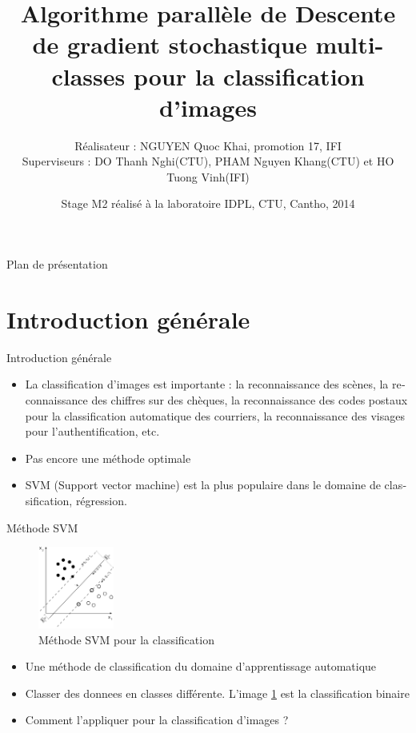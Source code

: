 \documentclass[11pt]{beamer}
\title{Algorithme parallèle de Descente de gradient stochastique multi-classes pour la classification d'images
}
\author[1]{Réalisateur : NGUYEN Quoc Khai, promotion 17, IFI \\[\baselineskip]
Superviseurs : DO Thanh Nghi(CTU), PHAM Nguyen Khang(CTU) et HO Tuong Vinh(IFI)
}
\date{Stage M2 réalisé à la laboratoire IDPL, CTU, Cantho, 2014}
\begin{document}
\begin{otherlanguage}{french}
\begin{frame}
  \titlepage
\end{frame}


\begin{frame}{Plan de présentation}
  \tableofcontents
\end{frame}


\section{Introduction générale}
\begin{frame}{Introduction générale}
\begin{itemize}
\item La classification d'images est importante : la reconnaissance des scènes, la reconnaissance des chiffres sur des chèques, la reconnaissance des codes postaux pour la classification automatique des courriers, la reconnaissance des visages pour l'authentification, etc.

\item Pas encore une méthode optimale

\item SVM (Support vector machine) est la plus populaire dans le domaine de classification, régression.

\end{itemize}
\end{frame}

\begin{frame}{Méthode SVM}

\begin{figure}[ht!]
\centering
\includegraphics[width=25mm]{images/svm}
\caption{Méthode SVM pour la classification}
\vspace{-2.0em}
\label{fig:svm}
\end{figure}

\begin{itemize}
\item Une méthode de classification du domaine d'apprentissage automatique
\item Classer des donnees en classes différente. L'image \ref{fig:svm} est la classification binaire 
\item Comment l'appliquer pour la classification d'images ?
\end{itemize}
\end{frame}


\end{otherlanguage}
\end{document}
